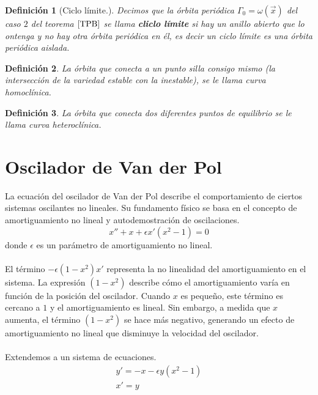 \documentclass[12pt, a4paper]{report}
\newtheorem{definition}{Definición}
\begin{document}
\begin{definition}[Ciclo límite.]
	Decimos que la órbita periódica $\varGamma_0=\omega(\vec{x})$
	del caso $2$ del teorema $\ref{TPB}$ se llama
	\textbf{cliclo límite} si hay un anillo abierto que lo
	ontenga y no hay otra órbita periódica en él, es decir
	un ciclo límite es una órbita periódica aislada.

\end{definition}

\begin{definition}
	La órbita que conecta a un punto silla consigo mismo (la intersección de la variedad estable con la inestable), se le llama curva homoclínica.
\end{definition}

\begin{definition}
	La órbita que conecta dos diferentes puntos de equilibrio se le llama curva heteroclínica.

\end{definition}
\newpage

\section{Oscilador de Van der Pol}

La ecuación del oscilador de Van der Pol describe el comportamiento de ciertos sistemas oscilantes no lineales.
Su fundamento físico se basa en el concepto de amortiguamiento no lineal y autodemostración de oscilaciones.
\begin{equation}\label{eq: VP}
	x''+x+\epsilon x'(x^2-1)=0
\end{equation}
donde $\epsilon$ es un parámetro de amortiguamiento no lineal.\\
\\El término $-\epsilon(1 - x^2)x'$ representa la no linealidad del amortiguamiento en el sistema. La expresión
$(1 - x^2)$ describe cómo el amortiguamiento varía en función de la posición del oscilador. Cuando $x$ es
pequeño, este término es cercano a $1$ y el amortiguamiento es lineal. Sin embargo, a medida que $x$
aumenta, el término $(1 - x^2)$ se hace más negativo, generando un efecto de amortiguamiento no lineal que
disminuye la velocidad del oscilador.\\
\\Extendemos a un sistema de ecuaciones.
\begin{equation}\label{eq: VPsis}
	\begin{matrix}
		y'=-x-\epsilon y(x^2-1) \\
		x'=y
	\end{matrix}
\end{equation}
\end{document}
